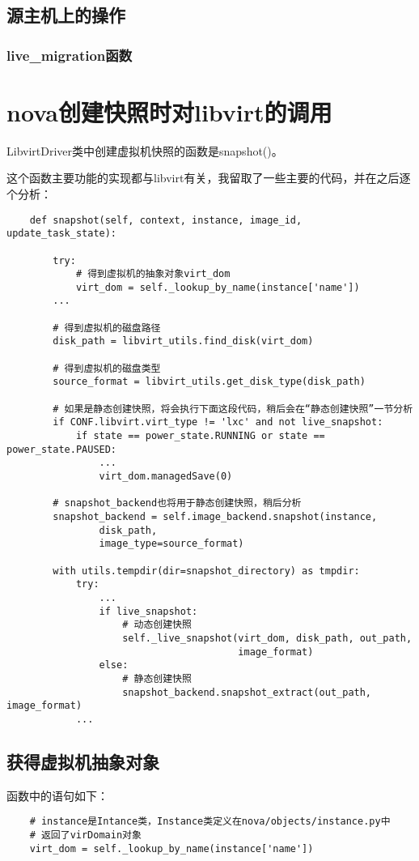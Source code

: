 \documentclass[a4paper,left=1.5cm,right=1.5cm,11pt]{article}
\begin{document}
\subsection{源主机上的操作}
\subsubsection{live\_migration函数}

\clearpage

\section{nova创建快照时对libvirt的调用}
	LibvirtDriver类中创建虚拟机快照的函数是snapshot()。\par

	这个函数主要功能的实现都与libvirt有关，我留取了一些主要的代码，并在之后逐个分析：
	\begin{lstlisting}
	def snapshot(self, context, instance, image_id, update_task_state):

        try:
			# 得到虚拟机的抽象对象virt_dom
            virt_dom = self._lookup_by_name(instance['name'])
        ...

		# 得到虚拟机的磁盘路径
        disk_path = libvirt_utils.find_disk(virt_dom)

		# 得到虚拟机的磁盘类型
        source_format = libvirt_utils.get_disk_type(disk_path)

		# 如果是静态创建快照，将会执行下面这段代码，稍后会在“静态创建快照”一节分析
		if CONF.libvirt.virt_type != 'lxc' and not live_snapshot:
            if state == power_state.RUNNING or state == power_state.PAUSED:
                ...
                virt_dom.managedSave(0)

		# snapshot_backend也将用于静态创建快照，稍后分析
        snapshot_backend = self.image_backend.snapshot(instance,
                disk_path,
                image_type=source_format)

        with utils.tempdir(dir=snapshot_directory) as tmpdir:
            try:
				...
                if live_snapshot:
					# 动态创建快照
                    self._live_snapshot(virt_dom, disk_path, out_path,
                                        image_format)
                else:
					# 静态创建快照
                    snapshot_backend.snapshot_extract(out_path, image_format)
            ...
	\end{lstlisting}

\clearpage

\subsection{获得虚拟机抽象对象}
	函数中的语句如下：
	\begin{lstlisting}
	# instance是Intance类，Instance类定义在nova/objects/instance.py中
	# 返回了virDomain对象
	virt_dom = self._lookup_by_name(instance['name'])
	\end{lstlisting}
\end{document}
